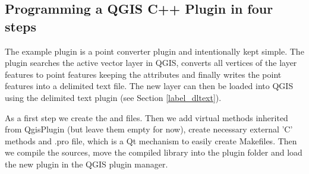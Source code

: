 \subsection{Programming a QGIS C++ Plugin in four steps}

The example plugin is a point converter plugin and intentionally kept simple. 
The plugin searches the active vector layer in QGIS, converts all vertices of
the layer features to point features keeping the attributes and finally
writes the point features into a delimited text file. The new layer can then
be loaded into QGIS using the delimited text plugin (see Section
\ref{label_dltext}).


As a first step we create the  and
 files. Then we add virtual methods inherited
from QgisPlugin (but leave them empty for now), create necessary external 'C'
methods and .pro file, which is a Qt mechanism to easily create Makefiles.
Then we compile the sources, move the compiled library into the plugin folder
and load the new plugin in the QGIS plugin manager.

